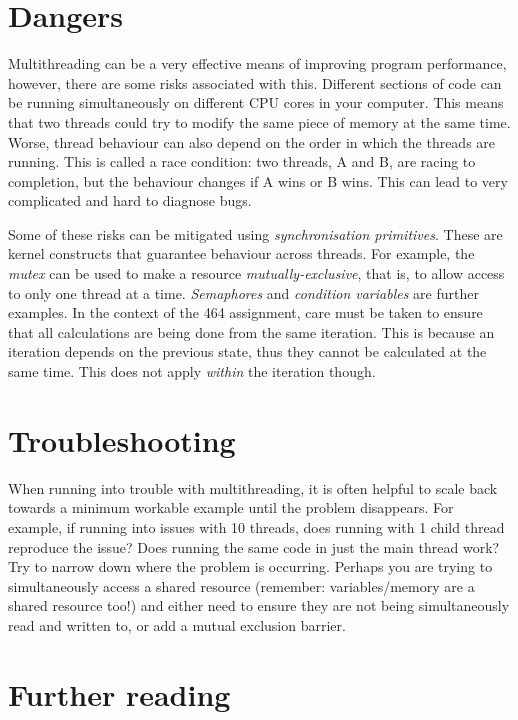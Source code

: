 \documentclass[a4paper,11pt]{article}
\begin{document}
\section{Dangers}

Multithreading can be a very effective means of improving program performance,
however, there are some risks associated with this. Different sections of code
can be running simultaneously on different CPU cores in your computer. This
means that two threads could try to modify the same piece of memory at the same
time. Worse, thread behaviour can also depend on the order in which the threads
are running. This is called a race condition: two threads, A and B, are racing
to completion, but the behaviour changes if A wins or B wins. This can lead to
very complicated and hard to diagnose bugs.

Some of these risks can be mitigated using \emph{synchronisation primitives}.
These are kernel constructs that guarantee behaviour across threads. For
example, the \emph{mutex} can be used to make a resource
\emph{mutually-exclusive}, that is, to allow access to only one thread at a time.
\emph{Semaphores} and \emph{condition variables} are further examples. In the
context of the 464 assignment, care must be taken to ensure that all
calculations are being done from the same iteration. This is because an
iteration depends on the previous state, thus they cannot be calculated at the
same time. This does not apply \emph{within} the iteration though.


\section{Troubleshooting}

When running into trouble with multithreading, it is often helpful to scale back
towards a minimum workable example until the problem disappears. For example, if
running into issues with 10 threads, does running with 1 child thread reproduce
the issue? Does running the same code in just the main thread work? Try to
narrow down where the problem is occurring. Perhaps you are trying to
simultaneously access a shared resource (remember: variables/memory are a shared
resource too!) and either need to ensure they are not being simultaneously read
and written to, or add a mutual exclusion barrier.

\section{Further reading}
\end{document}
